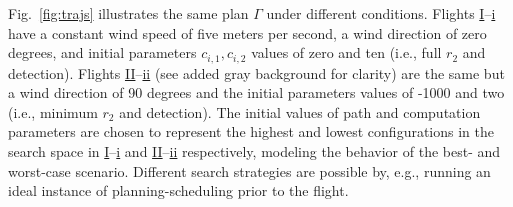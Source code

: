 \documentclass[letterpaper,10pt,journal,twoside]{IEEEtran}
\theoremstyle{definition}
\begin{document}
Fig.~\ref{fig:trajs} illustrates the same plan $\Gamma$ under different conditions. Flights \hyperref[fig:trajs-I-static]{I}--\hyperref[fig:trajs-dyn-i]{i} have a constant wind speed of five meters per second, a wind direction of zero degrees, and initial parameters $c_{i,1},c_{i,2}$ values of zero and ten (i.e., full $r_2$ and detection). Flights \hyperref[fig:trajs-II-static]{II}--\hyperref[fig:trajs-dyn-ii]{ii} (see added gray background for clarity) are the same but a wind direction of 90 degrees and the initial parameters values of -1000 and two (i.e., minimum $r_2$ and detection). 
{\color{blue} The initial values of path and computation parameters are chosen to represent the highest and lowest configurations in the search space in \hyperref[fig:trajs-I-static]{I}--\hyperref[fig:trajs-dyn-i]{i} and \hyperref[fig:trajs-II-static]{II}--\hyperref[fig:trajs-dyn-ii]{ii} respectively, modeling the behavior of the best- and worst-case scenario.
Different search strategies are possible by, e.g., running an ideal instance of planning-scheduling prior to the flight.}
\end{document}
